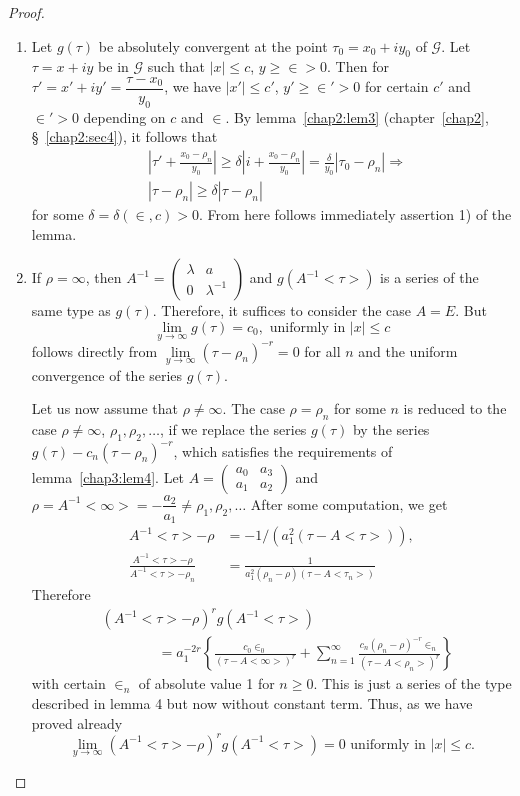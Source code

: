 \begin{proof}
\begin{enumerate}
\renewcommand{\theenumi}{\roman{enumi}}
\renewcommand{\labelenumi}{(\theenumi)}
\item Let $g(\tau)$ be absolutely convergent at the point
  $\tau_0=x_0+iy_0$ of $\mathscr{G}$. Let $\tau=x+iy$ be in
  $\mathscr{G}$ such that $|x|\leq c$, $y \geq \in >0$. Then
  for $\tau'=x'+iy'=\dfrac{\tau-x_0}{y_0}$, we have $|x'|\leq c'$,
  $y'\geq \in' >0$ for certain $c'$ and $\in'>0$
  depending on $c$ and $\in$. By lemma~\ref{chap2:lem3} 
(chapter~\ref{chap2}, \S~\ref{chap2:sec4}),
  it follows that 
\begin{align*}
& |\tau' + \frac{x_0-\rho_n}{y_0}| \geq \delta |
  i+\frac{x_0-\rho_n}{y_0}| = \frac{\delta}{y_0} |\tau_0-\rho_n|
  \Longrightarrow\\
& |\tau-\rho_n| \geq \delta |\tau-\rho_n|
\end{align*}
for some $\delta =\delta(\in, c)>0$. From here follows
immediately assertion 1) of the lemma.

\item If $\rho=\infty$, then $A^{-1} =
  \left(\begin{smallmatrix} \lambda & a\\0 &
    \lambda^{-1} \end{smallmatrix}\right)$ and $g(A^{-1}<\tau>)$ is a
  series of the same type as $g(\tau)$. Therefore, it suffices to
  consider the case $A=E$. But 
$$
\lim\limits_{y\to \infty} g(\tau) = c_0, \text{ uniformly in }|x|\leq c
$$
follows directly from $\lim\limits_{y\to \infty}(\tau-\rho_n)^{-r}=0$
for all $n$ and the uniform convergence of the series $g(\tau)$.

Let \pageoriginale us now assume that $\rho\neq \infty$. The case
$\rho=\rho_n$ for some $n$ is reduced to the case $\rho \neq \infty$,
$\rho_1, \rho_2, \ldots$, if we replace the series $g(\tau)$ by the
series $g(\tau)-c_n(\tau-\rho_n)^{-r}$, which satisfies the
requirements of lemma~\ref{chap3:lem4}. 
Let $A= \left(\begin{smallmatrix} a_0 & a_3\\a_1 &
  a_2 \end{smallmatrix}\right)$ and $\rho=A^{-1}<\infty> =
-\dfrac{a_2}{a_1}\neq \rho_1, \rho_2 ,\ldots$ After some computation,
we get 
\begin{align*}
A^{-1}<\tau> - \rho & = -1 /(a^2_1(\tau-A<\tau>)),\\
\frac{A^{-1}<\tau>-\rho}{A^{-1}<\tau>-\rho_n} & =
\frac{1}{a^2_1(\rho_n-\rho)(\tau-A<\tau_n>)} 
\end{align*}
Therefore
\begin{align*}
&(A^{-1}<\tau>-\rho)^r g(A^{-1}<\tau>)\\
&\qquad\qquad=a^{-2r}_1
\left\{\frac{c_0\in_0}{(\tau-A<\infty>)^r} +
 \sum^{\infty}_{n=1}
 \frac{c_n(\rho_n-\rho)^{-r}\in_n}{(\tau-A<\rho_n>)^r}
 \right\} 
\end{align*}
with certain $\in_n$ of absolute value 1 for $n\geq 0$. This
is just a series of the type described in lemma 4 but now without
constant term. Thus, as we have proved already
$$
\lim\limits_{y \to \infty} (A^{-1}<\tau>-\rho)^r g(A^{-1}<\tau>) = 0
\text{ uniformly in } |x| \leq c.
$$


\end{enumerate}
\end{proof}
